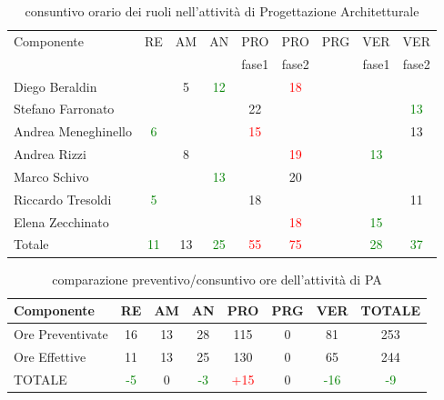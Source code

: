\begin{table}[h]
\centering
\begin{tabular}{|l|c|c|c|c|c|c|c|c|}
\hline
\multirow{2}{*}{Componente}& RE& AM& AN& PRO& PRO& PRG& VER& VER\\
                    &    &      &      &fase1          &fase2         &        &fase1	 &fase2\\ 
\hline
Diego Beraldin 	& & 5& \textcolor{green}{12}& & \textcolor{red}{18}& & &\\
Stefano Farronato & & & & 22& & & & \textcolor{green}{13}\\
Andrea Meneghinello & \textcolor{green}{6}& & & \textcolor{red}{15}& & & & 13\\
Andrea Rizzi & & 8& & & \textcolor{red}{19}& & \textcolor{green}{13}& \\
Marco Schivo & & & \textcolor{green}{13}& & 20& & & \\
Riccardo Tresoldi & \textcolor{green}{5}& & & 18& & & & 11\\
Elena Zecchinato & & & & & \textcolor{red}{18}& & \textcolor{green}{15}& \\
\hline
Totale & \textcolor{green}{11}& 13& \textcolor{green}{25}&\textcolor{red} {55}& \textcolor{red}{75}& & \textcolor{green}{28}& \textcolor{green}{37}\\
\hline
\end{tabular}
\caption{consuntivo orario dei ruoli nell'attività di Progettazione Architetturale}\label{tab:consruoliprog}
\end{table}




\begin{table}[h]
\centering
\begin{tabular}{|l|c c c c c c|c|}
\hline
Componente		& RE&   AM&   AN&  PRO& PRG& VER & TOTALE\\
\hline
Ore Preventivate	& 16&    13&   28&  115& 0&     81  & 253\\
Ore Effettive       	& 11 &   13&   25&  130& 0&     65 & 244\\
\hline
TOTALE			& \textcolor{green}{-5} &    0&    \textcolor{green}{-3}&    \textcolor{red}{+15}&0&    \textcolor{green}{-16} & \textcolor{green}{-9}\\
\hline
\end{tabular}
\caption{comparazione preventivo/consuntivo ore dell'attività di PA}\label{tab:consoreprog}
\end{table}


